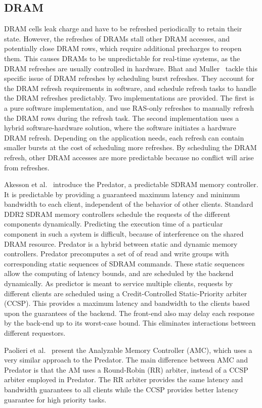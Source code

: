 \subsection{DRAM}
DRAM cells leak charge and have to be refreshed periodically to retain their state.
However, the refreshes of DRAMs stall other DRAM accesses, and potentially close DRAM rows, which require additional precharges to reopen them.
This causes DRAMs to be unpredictable for real-time systems, as the DRAM refreshes are usually controlled in hardware. 
Bhat and Muller~\cite{Bhat2010PredictableDRAM} tackle this specific issue of DRAM refreshes by scheduling burst refreshes.
They account for the DRAM refresh requirements in software, and schedule refresh tasks to handle the DRAM refreshes predictably. 
Two implementations are provided. 
The first is a pure software implementation, and use RAS-only refreshes to manually refresh the DRAM rows during the refresh task. 
The second implementation uses a hybrid software-hardware solution, where the software initiates a hardware DRAM refresh. 
Depending on the application needs, each refresh can contain smaller bursts at the cost of scheduling more refreshes. 
By scheduling the DRAM refresh, other DRAM accesses are more predictable because no conflict will arise from refreshes.  

Akesson et al.~\cite{Akesson2007CODES,Akesson2009DSD,Akesson2010} introduce the Predator, a predictable SDRAM memory controller. 
It is predictable by providing a guaranteed maximum latency and minimum bandwidth to each client, independent of the behavior of other clients. 
Standard DDR2 SDRAM memory controllers schedule the requests of the different components dynamically. 
Predicting the execution time of a particular component in such a system is difficult, because of interference on the shared DRAM resource. 
Predator is a hybrid between static and dynamic memory controllers.
Predator precomputes a set of of read and write groups with corresponding static sequences of SDRAM commands.
These static sequences allow the computing of latency bounds, and are scheduled by the backend dynamically. 
As predictor is meant to service multiple clients, requests by different clients are scheduled using a Credit-Controlled Static-Priority arbiter (CCSP). 
This provides a maximum latency and bandwidth to the clients based upon the guarantees of the backend. 
The front-end also may delay each response by the back-end up to its worst-case bound.
This eliminates interactions between different requestors.

Paolieri et al.~\cite{Paolieri2009ESL} present the Analyzable Memory Controller (AMC), which uses a very similar approach to the Predator. 
The main difference between AMC and Predator is that the AM uses a Round-Robin (RR) arbiter, instead of a CCSP arbiter employed in Predator. 
The RR arbiter provides the same latency and bandwidth guarantees to all clients while the CCSP provides better latency guarantee for high priority tasks. 
